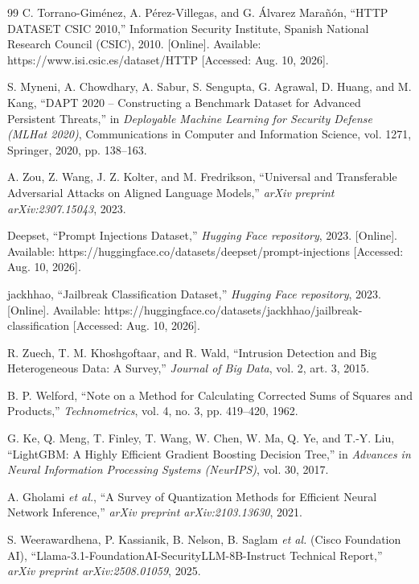 \documentclass[12pt,a4paper]{report}
\begin{document}
\begin{thebibliography}{99}
C. Torrano-Giménez, A. Pérez-Villegas, and G. Álvarez Marañón, ``HTTP DATASET CSIC 2010,'' Information Security Institute, Spanish National Research Council (CSIC), 2010. [Online]. Available: https://www.isi.csic.es/dataset/HTTP [Accessed: Aug. 10, 2026].

S. Myneni, A. Chowdhary, A. Sabur, S. Sengupta, G. Agrawal, D. Huang, and M. Kang, ``DAPT 2020 -- Constructing a Benchmark Dataset for Advanced Persistent Threats,'' in \textit{Deployable Machine Learning for Security Defense (MLHat 2020)}, Communications in Computer and Information Science, vol. 1271, Springer, 2020, pp. 138--163.

A. Zou, Z. Wang, J. Z. Kolter, and M. Fredrikson, ``Universal and Transferable Adversarial Attacks on Aligned Language Models,'' \textit{arXiv preprint arXiv:2307.15043}, 2023.

Deepset, ``Prompt Injections Dataset,'' \textit{Hugging Face repository}, 2023. [Online]. Available: https://huggingface.co/datasets/deepset/prompt-injections [Accessed: Aug. 10, 2026].

jackhhao, ``Jailbreak Classification Dataset,'' \textit{Hugging Face repository}, 2023. [Online]. Available: https://huggingface.co/datasets/jackhhao/jailbreak-classification [Accessed: Aug. 10, 2026].

R. Zuech, T. M. Khoshgoftaar, and R. Wald, ``Intrusion Detection and Big Heterogeneous Data: A Survey,'' \textit{Journal of Big Data}, vol. 2, art. 3, 2015.

B. P. Welford, ``Note on a Method for Calculating Corrected Sums of Squares and Products,'' \textit{Technometrics}, vol. 4, no. 3, pp. 419--420, 1962.

G. Ke, Q. Meng, T. Finley, T. Wang, W. Chen, W. Ma, Q. Ye, and T.-Y. Liu, ``LightGBM: A Highly Efficient Gradient Boosting Decision Tree,'' in \textit{Advances in Neural Information Processing Systems (NeurIPS)}, vol. 30, 2017.

A. Gholami \textit{et al.}, ``A Survey of Quantization Methods for Efficient Neural Network Inference,'' \textit{arXiv preprint arXiv:2103.13630}, 2021.

S. Weerawardhena, P. Kassianik, B. Nelson, B. Saglam \textit{et al.} (Cisco Foundation AI), ``Llama-3.1-FoundationAI-SecurityLLM-8B-Instruct Technical Report,'' \textit{arXiv preprint arXiv:2508.01059}, 2025.


\end{thebibliography}
\end{document}
